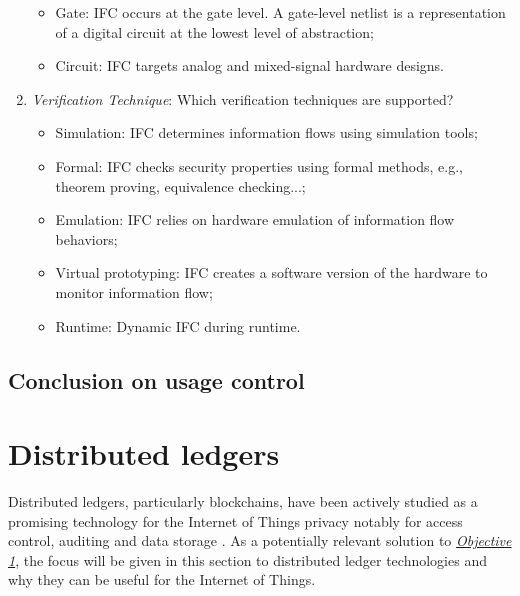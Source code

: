\begin{enumerate}
\begin{itemize}
        \item Gate: IFC occurs at the gate level. A gate-level netlist is a representation of a digital circuit at the lowest level of abstraction;
        \item Circuit: IFC targets analog and mixed-signal hardware designs.
    \end{itemize}
    \item \emph{Verification Technique}: Which verification techniques are supported?
    \begin{itemize}
        \item Simulation: IFC determines information flows using simulation tools;
        \item Formal: IFC checks security properties using formal methods, e.g., theorem proving, equivalence checking...;
        \item Emulation: IFC relies on hardware emulation of information flow behaviors;
        \item Virtual prototyping: IFC creates a software version of the hardware to monitor information flow;
        \item Runtime: Dynamic IFC during runtime.
    \end{itemize}
\end{enumerate}

\subsection{Conclusion on usage control}

\section{Distributed ledgers}
\label{S_distributed_ledgers}
Distributed ledgers, particularly blockchains, have been actively studied as a promising technology for the Internet of Things privacy \cite{Rifi2017, Zhaofeng2021, Goyat2022, Rajasekaran2023, Bao2023} notably for access control, auditing and data storage \cite{Cha2019}. 
As a potentially relevant solution to \hyperref[obj:1]{\emph{Objective 1}}, the focus will be given in this section to distributed ledger technologies and why they can be useful for the Internet of Things.

